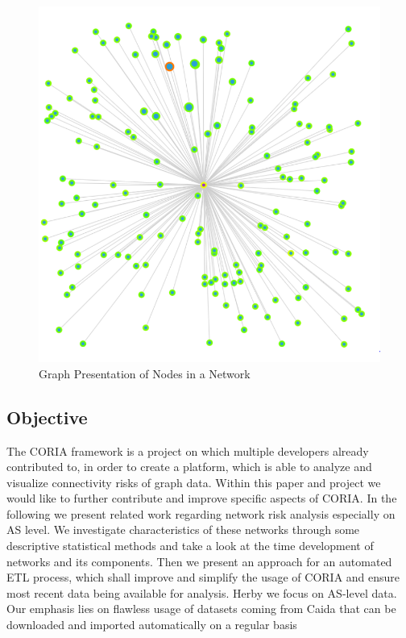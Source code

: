 \documentclass[conference]{IEEEtran}
\begin{document}
\begin{figure}[htbp]
\centerline{\includegraphics[scale=0.2]{Graphics/nodePresentaion.PNG}}
\caption{Graph Presentation of Nodes in a Network}
\label{fig}
\end{figure}



\subsection{Objective}
The CORIA framework is a project on which multiple developers already contributed to, in order to create a platform, which is able to analyze and visualize connectivity risks of graph data. Within this paper and project we would like to further contribute and improve specific aspects of CORIA. In the following we present related work regarding network risk analysis especially on AS level. We investigate characteristics of these networks through some descriptive statistical methods and take a look at the time development of networks and its components. Then we present an approach for an automated ETL process, which shall improve and simplify the usage of CORIA and ensure most recent data being available for analysis. Herby we focus on AS-level data. Our emphasis lies on flawless usage of datasets coming from Caida that can be downloaded and imported automatically on a regular basis \\
\end{document}
